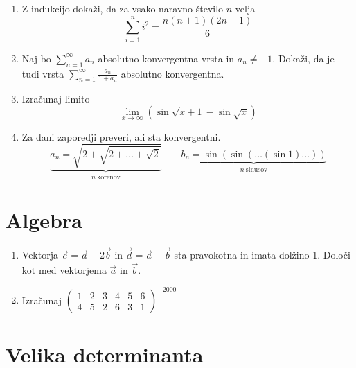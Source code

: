 \documentclass[a4paper,12pt]{article}
\begin{document}
\begin{enumerate}
\item
Z indukcijo dokaži, da za vsako naravno število \(n\) velja
\[\sum_{i=1}^{n}i^2=\frac{n(n+1)(2n+1)}{6}\]

\item
Naj bo \(\sum_{n=1}^{\infty}a_n\) absolutno konvergentna vrsta in \(a_n \ne -1\).
Dokaži, da je tudi vrsta \(\sum_{n=1}^\infty \frac{a_n}{1+a_n}\)
absolutno konvergentna.

\item
Izračunaj limito
\[\lim_{x \rightarrow \infty}(\sin \sqrt{x+1} - \sin \sqrt{x})\]

\item
Za dani zaporedji preveri, ali sta konvergentni.
\[\underbrace{a_n = \sqrt{2+\sqrt{2+\dots+\sqrt{2}}}}_{n~\text{korenov}} \qquad \underbrace{b_n = \sin(\sin(\dots(\sin 1)\dots))}_{n~\text{sinusov}}\]
\end{enumerate}

\section*{Algebra}

\begin{enumerate}
\item
Vektorja \(\vec{c}=\vec{a}+2\vec{b}\) in \(\vec{d}=\vec{a}-\vec{b}\)
sta pravokotna in imata dolžino 1. Določi kot med vektorjema \(\vec{a}\) in \(\vec{b}\).

\item
Izračunaj
\(\begin{pmatrix}
    1 & 2 & 3 & 4 & 5 & 6 \\
    4 & 5 & 2 & 6 & 3 & 1
\end{pmatrix}^{-2000}\)
\end{enumerate}

\section*{Velika determinanta}
\end{document}
